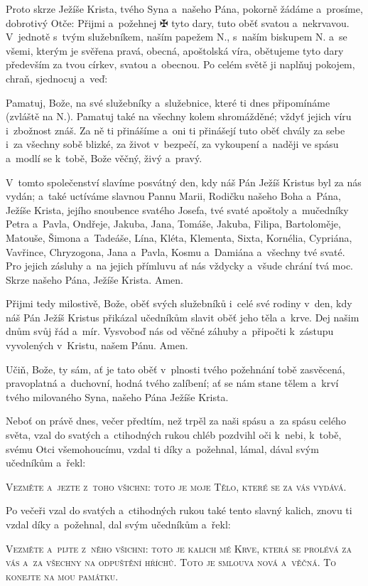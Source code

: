 Proto skrze Ježíše Krista, tvého Syna a~našeho Pána, pokorně žádáme a~prosíme, dobrotivý Otče: Přijmi a~požehnej {\color{red}✠} tyto dary, tuto oběť svatou a~nekrvavou. V~jednotě s~tvým služebníkem, naším papežem {\color{red}N.}, s~naším biskupem {\color{red}N.} a~se všemi, kterým je svěřena pravá, obecná, apoštolská víra, obětujeme tyto dary především za tvou církev, svatou a~obecnou. Po celém světě ji naplňuj pokojem, chraň, sjednocuj a~veď:

Pamatuj, Bože, na své služebníky a~služebnice, které ti dnes připomínáme (zvláště na {\color{red}N.}). Pamatuj také na všechny kolem shromážděné; vždyť jejich víru i~zbožnost znáš. Za ně ti přinášíme a~oni ti přinášejí tuto oběť chvály  za sebe i~za všechny sobě blizké, za život v~bezpečí, za vykoupení a~naději ve spásu a~modlí se k~tobě, Bože věčný, živý a~pravý.

V~tomto společenství slavíme posvátný den, kdy náš Pán Ježíš Kristus byl za nás vydán; a~také uctíváme slavnou Pannu Marii, Rodičku našeho Boha a~Pána, Ježíše Krista, jejího snoubence svatého Josefa, tvé svaté apoštoly a~mučedníky Pe\-tra a~Pavla, Ondřeje, Jakuba, Jana, Tomáše, Jakuba, Filipa, Bartoloměje, Matouše, Šimona a~Tadeáše, Lína, Kléta, Klementa, Sixta, Kornélia, Cypriána, Vavřince, Chryzogona, Jana a~Pavla, Kosmu a~Damiána a~všechny tvé svaté. Pro jejich zásluhy a~na jejich pří\-mluvu ať nás vždycky a~všude chrání tvá moc. Skrze našeho Pána, Ježíše Krista. Amen.

Přijmi tedy milostivě, Bože, oběť svých služebníků i~celé své rodiny v~den, kdy náš Pán Ježíš Kristus přikázal učedníkům slavit oběť jeho těla a~krve. Dej našim dnům svůj řád a~mír. Vysvoboď nás od věčné záhuby a~připočti k~zástupu vyvolených v~Kristu, našem Pánu. Amen.

Učiň, Bože, ty sám, ať je tato oběť v~plnosti tvého požehnání tobě zasvěcená, pravoplatná a~duchovní, hodná tvého zalíbení; ať se nám stane tělem a~krví tvého milovaného Syna, našeho Pána Ježíše Krista.

Neboť on právě dnes, večer předtím, než trpěl za naši spásu a~za spásu celého světa, vzal do svatých a~ctihodných rukou chléb pozdvihl oči k~nebi, k~tobě, svému Otci všemohoucímu, vzdal ti díky a~požehnal, lámal, dával svým učedníkům a~řekl:

\textsc{Vezměte a~jezte z~toho všichni: toto je moje Tělo, které se za vás vydává.}

Po večeři vzal do svatých a~ctihodných rukou také tento slavný kalich, znovu ti vzdal díky a~požehnal, dal svým učedníkům a~řekl:

\textsc{Vezměte a~pi\mbox{}jte z~něho všichni: toto je kalich mé Krve, která se prolévá za vás a~za všechny na odpuštění hříchů. Toto je smlouva nová a~věčná. To konejte na mou památku.}
